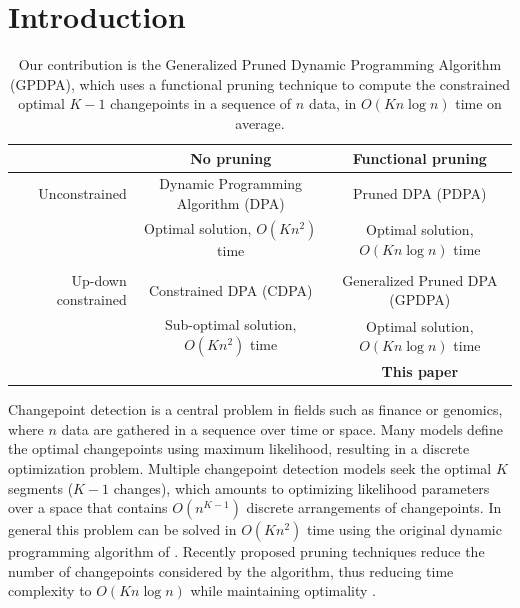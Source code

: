 \documentclass{article}
\begin{document}
\section{Introduction}

\begin{table}
  \centering
  \begin{tabular}{r|c|c}
    & No pruning & Functional pruning \\
    \hline
    Unconstrained & Dynamic Programming Algorithm (DPA) & Pruned DPA (PDPA) \\
    & Optimal solution, $O(Kn^2)$ time & Optimal solution, $O(Kn\log n)$ time\\
    & \citet{segment-neighborhood, optimal-partitioning}     & \citet{pruned-dp, johnson} \\
    \hline
    Up-down constrained & Constrained DPA (CDPA) & Generalized Pruned DPA (GPDPA) \\
    & Sub-optimal solution, $O(Kn^2)$ time & Optimal solution, $O(Kn\log n)$ time\\
    & \citet{HOCKING-PeakSeg} & \textbf{This paper} \\
    \hline
  \end{tabular}
  \caption{Our contribution is 
the Generalized Pruned Dynamic Programming Algorithm (GPDPA), 
 which uses a functional pruning technique 
    to compute the constrained optimal $K-1$ changepoints 
in a sequence of $n$ data, in $O(K n\log n)$ time on average.}
\label{tab:contribution}
\end{table}

Changepoint detection is a central problem in fields such as finance
or genomics, where $n$ data are gathered in a sequence over time or
space. Many models define the optimal changepoints using maximum
likelihood, resulting in a discrete optimization problem. Multiple
changepoint detection models seek the optimal $K$ segments
($K-1$ changes), which amounts to optimizing likelihood
parameters over a space that contains $O(n^{K-1})$ discrete
arrangements of changepoints. In general this problem can be solved
in $O(Kn^2)$ time using the original dynamic programming algorithm of
\citet{segment-neighborhood}. Recently proposed pruning techniques
reduce the number of changepoints considered by the algorithm, thus
reducing time complexity to $O(K n\log n)$ while maintaining
optimality \citep{pruned-dp, johnson, fpop}.
\end{document}
